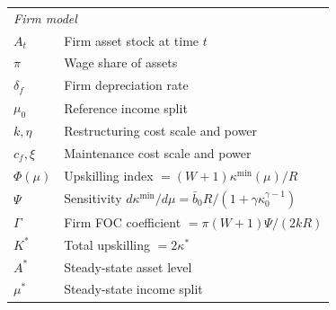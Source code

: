 \documentclass[12pt,a4paper]{article}
\begin{document}
\begin{table}[h!]
\begin{tabular}{lp{9cm}}
\midrule
\multicolumn{2}{l}{\textit{Firm model}} \\
$A_t$ & Firm asset stock at time $t$ \\
$\pi$ & Wage share of assets \\
$\delta_f$ & Firm depreciation rate \\
$\mu_0$ & Reference income split \\
$k, \eta$ & Restructuring cost scale and power \\
$c_f, \xi$ & Maintenance cost scale and power \\
$\Phi(\mu)$ & Upskilling index $= (W+1)\kappa^{\min}(\mu)/R$ \\
$\Psi$ & Sensitivity $d\kappa^{\min}/d\mu = \bar{b}_0 R/(1+\gamma\kappa_0^{\gamma-1})$ \\
$\Gamma$ & Firm FOC coefficient $= \pi(W+1)\Psi/(2kR)$ \\
$K^*$ & Total upskilling $= 2\kappa^*$ \\
$A^*$ & Steady-state asset level \\
$\mu^*$ & Steady-state income split \\
\bottomrule
\end{tabular}
\end{table}
\end{document}
